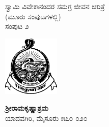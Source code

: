 \thispagestyle{empty}

ಸ್ವಾಮಿ ವಿವೇಕಾನಂದರ ಸಮಗ್ರ ಜೀವನ ಚರಿತ್ರೆ\\(ಮೂರು ಸಂಪುಟಗಳಲ್ಲಿ)\\ಸಂಪುಟ ೨



\begin{center}
\includegraphics{"images/logo.png"}
\end{center}

\textbf{ಶ್ರೀರಾಮಕೃಷ್ಣಾಶ್ರಮ}\\ಯಾದವಗಿರಿ, ಮೈಸೂರು ೫೭೦ ೦೨೦

